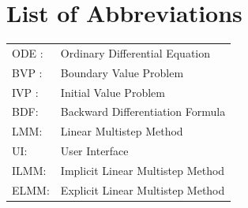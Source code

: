\documentclass[a4paper, twoside]{report} %
\begin{document}
\tableofcontents


\newpage
\listoffigures

\listoftables

\chapter*{List of Abbreviations}
\begin{tabular}{ll}
    ODE : & Ordinary Differential Equation \\
    BVP : & Boundary Value Problem \\
    IVP : & Initial Value Problem \\
    BDF: &Backward Differentiation Formula \\
    LMM: &Linear Multistep Method \\
    UI: &User Interface \\
    ILMM:& Implicit Linear Multistep Method \\
    ELMM: & Explicit Linear Multistep Method
\end{tabular}








 
\end{document}
